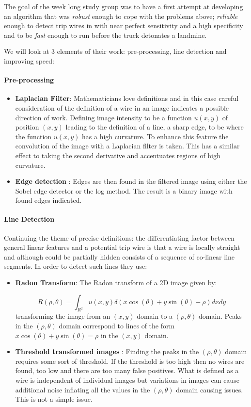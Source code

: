 \documentclass[11pt]{article} %
\begin{document}
	The goal of the week long study group was to have a first attempt at developing an algorithm that was \textsl{robust} enough to cope with the problems above; \textit{reliable }enough to detect trip wires in with near perfect sensitivity and a high specificity and to be \textit{fast} enough to run before the truck detonates a landmine. 
	
	We will look at 3 elements of their work: pre-processing, line detection and improving speed:
	\paragraph{Pre-processing}
\begin{itemize}
	\item \textbf{Laplacian Filter}: Mathematicians love definitions and in this case careful consideration of the definition of a wire in an image indicates a possible direction of work. Defining image intensity to be a function $u(x,y)$ of position $(x,y)$ leading to the definition of a line, a sharp edge,  to be where the function $u(x,y) $ has a high curvature.
	To enhance this feature the convolution of the image with a Laplacian filter is taken. This has a similar effect to taking the second derivative and accentuates regions of high curvature.	
	\item \textbf{Edge detection }: Edges are then found in the filtered image using either the Sobel edge detector or the log method. The result is a binary image with found edges indicated. 
	\end{itemize}
	
	\paragraph{Line Detection}
	Continuing the theme of precise definitions: the differentiating factor between general linear features and a potential trip wire is that a wire is locally straight and although could be partially hidden consists of a sequence of co-linear line segments. In order to detect such lines they use: 
		\begin{itemize}
		\item \textbf{Radon Transform}: The Radon transform of a 2D image given by:
		
		\begin{equation}
			R(\rho, \theta)=\int_{R^2} u(x,y)\delta(x\cos(\theta)+y\sin(\theta)-\rho) dx dy 					
		\end{equation}
		transforming the image from an $(x,y) $ domain to a $ (\rho, \theta)$ domain. Peaks in the $ (\rho, \theta)$ domain correspond to lines of the form $ x\cos(\theta)+y\sin(\theta)=\rho$ in the $(x,y) $ domain. 
		\item \textbf{Threshold transformed images }: Finding the peaks in the $ (\rho, \theta)$ domain requires some sort of threshold. If the threshold is too high then no wires are found, too low and there are too many false positives. What is defined as a wire is independent of individual images but variations in images can cause additional noise inflating all the values in the $ (\rho, \theta)$ domain causing issues. This is not a simple issue. 
	\end{itemize}
\end{document}
